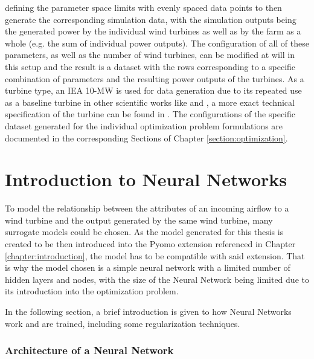  defining the parameter space limits with evenly spaced data points to then generate the corresponding simulation data, with the simulation outputs being the generated power by the individual wind turbines as well as by the farm as a whole (e.g. the sum of individual power outputs). The configuration of all of these parameters, as well as the number of wind turbines, can be modified at will in this setup and the result is a dataset with the rows corresponding to a specific combination of parameters and the resulting power outputs of the turbines. As a turbine type, an IEA 10-MW is used for data generation due to its repeated use as a baseline turbine in other scientific works like \cite{Madsen2022} and \cite{Kainz2024IEA}, a more exact technical specification of the turbine can be found in \cite{Bortolotti2019}. The configurations of the specific dataset generated for the individual optimization problem formulations are documented in the corresponding Sections of Chapter \ref{section:optimization}.


\section{Introduction to Neural Networks} \label{sec:modelling}

To model the relationship between the attributes of an incoming airflow to a wind turbine and the output generated by the same wind turbine, many surrogate models could be chosen. As the model generated for this thesis is created to be then introduced into the Pyomo extension referenced in Chapter \ref{chapter:introduction}, the model has to be compatible with said extension. That is why the model chosen is a simple neural network with a limited number of hidden layers and nodes, with the size of the Neural Network being limited due to its introduction into the optimization problem. 

In the following section, a brief introduction is given to how Neural Networks work and are trained, including some regularization techniques.

\subsubsection{Architecture of a Neural Network}

